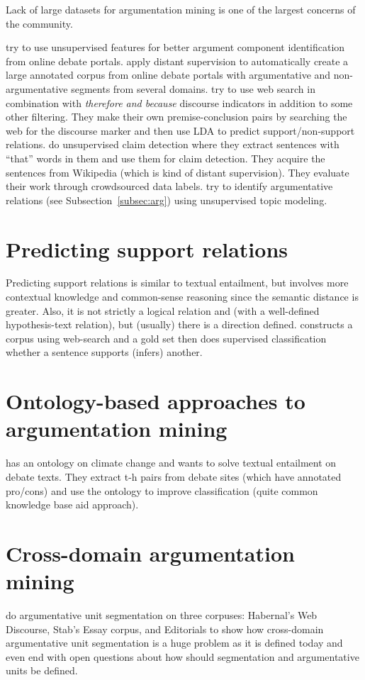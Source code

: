\documentclass[a4paper,10pt]{article}
\begin{document}
Lack of large datasets for argumentation mining is one of the largest
concerns of the community. 

\cite{habernal2015exploiting} try to use unsupervised features for
better argument component identification from online debate portals. 
\cite{al2016cross} apply distant supervision to automatically create
a large annotated corpus from online debate portals with argumentative and
non-argumentative segments from several domains. 
\cite{Lawrence2017} try to use web search in combination with
\emph{therefore and because} discourse indicators in addition to some
other filtering. They make their own premise-conclusion pairs by searching
the web for the discourse marker and then use LDA to predict
support/non-support relations.
\cite{Levy2017} do unsupervised claim detection where they extract
sentences with ``that'' words in them and use 
them for claim detection. They acquire the sentences 
from Wikipedia (which is kind of distant supervision).
They evaluate their work through crowdsourced data labels. 
\cite{Ferrara2017} try to identify argumentative relations (see
Subsection~\ref{subsec:arg}) using unsupervised topic modeling. 

\section{Predicting support relations}

Predicting support relations is similar to textual entailment, but
involves more contextual knowledge and common-sense reasoning since the
semantic distance is greater. Also, it is not strictly a logical relation
and (with a well-defined hypothesis-text relation), but (usually) there
is a direction defined.
\cite{Lawrence2017} constructs a corpus using web-search and a gold set
then does supervised classification whether a sentence supports (infers)
another. 

\section{Ontology-based approaches to argumentation mining}

\cite{Szabo2018} has an ontology on climate change and wants to solve 
textual entailment on debate texts. 
They extract t-h pairs from debate sites (which have annotated pro/cons)
and use the ontology to improve classification (quite common knowledge
base aid approach). 

\section{Cross-domain argumentation mining}

\cite{Ajjour2017} do argumentative unit segmentation on three corpuses:
Habernal's Web Discourse, Stab's Essay corpus, and Editorials to show
how cross-domain argumentative unit segmentation is a huge problem as it
is defined today and even end with open questions about how should
segmentation and argumentative units be defined. 



\end{document}
